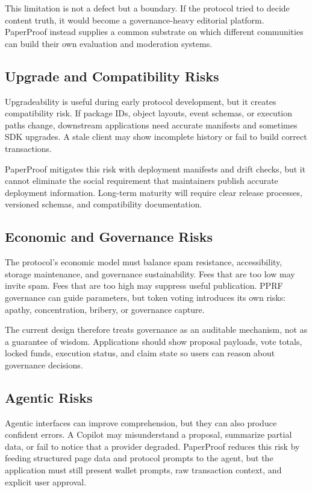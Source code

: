 \documentclass[journal]{IEEEtran}
\begin{document}
This limitation is not a defect but a boundary. If the protocol tried to decide content truth, it would become a governance-heavy editorial platform. PaperProof instead supplies a common substrate on which different communities can build their own evaluation and moderation systems.

\subsection{Upgrade and Compatibility Risks}

Upgradeability is useful during early protocol development, but it creates compatibility risk. If package IDs, object layouts, event schemas, or execution paths change, downstream applications need accurate manifests and sometimes SDK upgrades. A stale client may show incomplete history or fail to build correct transactions.

PaperProof mitigates this risk with deployment manifests and drift checks, but it cannot eliminate the social requirement that maintainers publish accurate deployment information. Long-term maturity will require clear release processes, versioned schemas, and compatibility documentation.

\subsection{Economic and Governance Risks}

The protocol's economic model must balance spam resistance, accessibility, storage maintenance, and governance sustainability. Fees that are too low may invite spam. Fees that are too high may suppress useful publication. PPRF governance can guide parameters, but token voting introduces its own risks: apathy, concentration, bribery, or governance capture.

The current design therefore treats governance as an auditable mechanism, not as a guarantee of wisdom. Applications should show proposal payloads, vote totals, locked funds, execution status, and claim state so users can reason about governance decisions.

\subsection{Agentic Risks}

Agentic interfaces can improve comprehension, but they can also produce confident errors. A Copilot may misunderstand a proposal, summarize partial data, or fail to notice that a provider degraded. PaperProof reduces this risk by feeding structured page data and protocol prompts to the agent, but the application must still present wallet prompts, raw transaction context, and explicit user approval.
\end{document}
